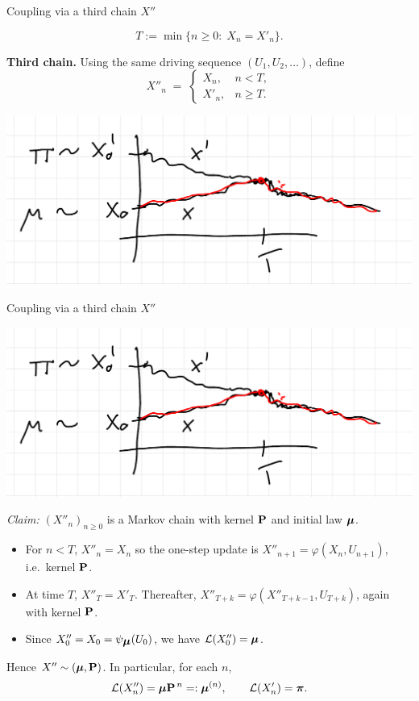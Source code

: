 \documentclass[aspectratio=169]{beamer}
\begin{document}
 \begin{frame}{Coupling via a third chain \(X''\)}

\[
T:=\min\{n\ge0:\;X_n=X'_n\}.
\]

\textbf{Third chain.} Using the same driving sequence \((U_1,U_2,\ldots)\), define
\[
X''_n \;=\; \begin{cases}
X_n, & n<T,\\[2pt]
X'_n, & n\ge T.
\end{cases}
\]
\begin{center}
\includegraphics[width=0.6\linewidth]{pics/coupling_indep3.png}
\end{center}

\end{frame}



 \begin{frame}{Coupling via a third chain \(X''\)}

\begin{center}
\includegraphics[width=0.4\linewidth]{pics/coupling_indep3.png}
\end{center}
\emph{Claim:} \((X''_n)_{n\ge0}\) is a Markov chain with kernel \(\mathbf{P}\) and initial law \(\mbox{\boldmath $\mu$}\).
\begin{itemize}\itemsep2pt
\item For \(n<T\), \(X''_n=X_n\) so the one-step update is \(X''_{n+1}=\varphi(X_n,U_{n+1})\), i.e.\ kernel \(\mathbf{P}\).
\item At time \(T\), \(X''_T=X'_T\). Thereafter, \(X''_{T+k}=\varphi(X''_{T+k-1},U_{T+k})\), again with kernel \(\mathbf{P}\).
\item Since \(X''_0=X_0=\psi_{\mbox{\boldmath $\mu$}}(U_0)\), we have \(\mathcal{L}(X''_0)=\mbox{\boldmath $\mu$}\).
\end{itemize}
Hence \(X''\sim(\mbox{\boldmath $\mu$},\mathbf{P})\). In particular, for each \(n\),
\[
\mathcal{L}(X''_n)=\mbox{\boldmath $\mu$}\mathbf{P}^{\,n}=: \mbox{\boldmath $\mu$}^{(n)}, \qquad \mathcal{L}(X'_n)=\mbox{\boldmath$\pi$}.
\]
\end{frame}
\end{document}
